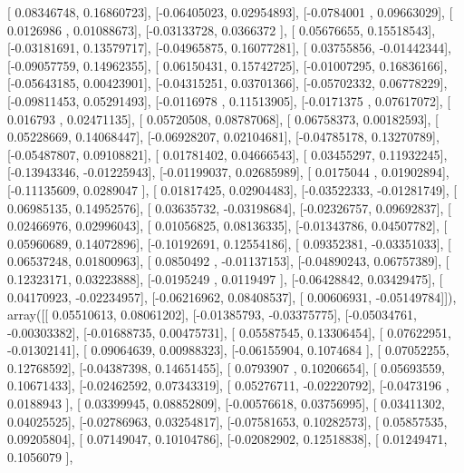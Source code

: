 \documentclass{article}
\begin{document}
       [ 0.08346748,  0.16860723],
       [-0.06405023,  0.02954893],
       [-0.0784001 ,  0.09663029],
       [ 0.0126986 ,  0.01088673],
       [-0.03133728,  0.0366372 ],
       [ 0.05676655,  0.15518543],
       [-0.03181691,  0.13579717],
       [-0.04965875,  0.16077281],
       [ 0.03755856, -0.01442344],
       [-0.09057759,  0.14962355],
       [ 0.06150431,  0.15742725],
       [-0.01007295,  0.16836166],
       [-0.05643185,  0.00423901],
       [-0.04315251,  0.03701366],
       [-0.05702332,  0.06778229],
       [-0.09811453,  0.05291493],
       [-0.0116978 ,  0.11513905],
       [-0.0171375 ,  0.07617072],
       [ 0.016793  ,  0.02471135],
       [ 0.05720508,  0.08787068],
       [ 0.06758373,  0.00182593],
       [ 0.05228669,  0.14068447],
       [-0.06928207,  0.02104681],
       [-0.04785178,  0.13270789],
       [-0.05487807,  0.09108821],
       [ 0.01781402,  0.04666543],
       [ 0.03455297,  0.11932245],
       [-0.13943346, -0.01225943],
       [-0.01199037,  0.02685989],
       [ 0.0175044 ,  0.01902894],
       [-0.11135609,  0.0289047 ],
       [ 0.01817425,  0.02904483],
       [-0.03522333, -0.01281749],
       [ 0.06985135,  0.14952576],
       [ 0.03635732, -0.03198684],
       [-0.02326757,  0.09692837],
       [ 0.02466976,  0.02996043],
       [ 0.01056825,  0.08136335],
       [-0.01343786,  0.04507782],
       [ 0.05960689,  0.14072896],
       [-0.10192691,  0.12554186],
       [ 0.09352381, -0.03351033],
       [ 0.06537248,  0.01800963],
       [ 0.0850492 , -0.01137153],
       [-0.04890243,  0.06757389],
       [ 0.12323171,  0.03223888],
       [-0.0195249 ,  0.0119497 ],
       [-0.06428842,  0.03429475],
       [ 0.04170923, -0.02234957],
       [-0.06216962,  0.08408537],
       [ 0.00606931, -0.05149784]]), array([[ 0.05510613,  0.08061202],
       [-0.01385793, -0.03375775],
       [-0.05034761, -0.00303382],
       [-0.01688735,  0.00475731],
       [ 0.05587545,  0.13306454],
       [ 0.07622951, -0.01302141],
       [ 0.09064639,  0.00988323],
       [-0.06155904,  0.1074684 ],
       [ 0.07052255,  0.12768592],
       [-0.04387398,  0.14651455],
       [ 0.0793907 ,  0.10206654],
       [ 0.05693559,  0.10671433],
       [-0.02462592,  0.07343319],
       [ 0.05276711, -0.02220792],
       [-0.0473196 ,  0.0188943 ],
       [ 0.03399945,  0.08852809],
       [-0.00576618,  0.03756995],
       [ 0.03411302,  0.04025525],
       [-0.02786963,  0.03254817],
       [-0.07581653,  0.10282573],
       [ 0.05857535,  0.09205804],
       [ 0.07149047,  0.10104786],
       [-0.02082902,  0.12518838],
       [ 0.01249471,  0.1056079 ],
\end{document}

